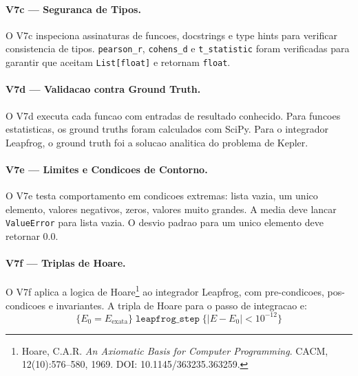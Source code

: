 \paragraph{V7c --- Seguranca de Tipos.}

O V7c inspeciona assinaturas de funcoes, docstrings e type hints para
verificar consistencia de tipos. \texttt{pearson\_r}, \texttt{cohens\_d}
e \texttt{t\_statistic} foram verificadas para garantir que aceitam
\texttt{List[float]} e retornam \texttt{float}.

\paragraph{V7d --- Validacao contra Ground Truth.}

O V7d executa cada funcao com entradas de resultado conhecido. Para
funcoes estatisticas, os ground truths foram calculados com SciPy.
Para o integrador Leapfrog, o ground truth foi a solucao analitica do
problema de Kepler.

\paragraph{V7e --- Limites e Condicoes de Contorno.}

O V7e testa comportamento em condicoes extremas: lista vazia, um unico
elemento, valores negativos, zeros, valores muito grandes. A media deve
lancar \texttt{ValueError} para lista vazia. O desvio padrao para um
unico elemento deve retornar 0.0.

\paragraph{V7f --- Triplas de Hoare.}

O V7f aplica a logica de Hoare\footnote{Hoare, C.A.R. \textit{An Axiomatic
Basis for Computer Programming}. CACM, 12(10):576--580, 1969. DOI:
10.1145/363235.363259.} ao integrador Leapfrog, com pre-condicoes,
pos-condicoes e invariantes. A tripla de Hoare para o passo de
integracao e:
\[
\{E_0 = E_{\text{exata}}\} \;
\texttt{leapfrog\_step} \;
\{|E - E_0| < 10^{-12}\}
\]

